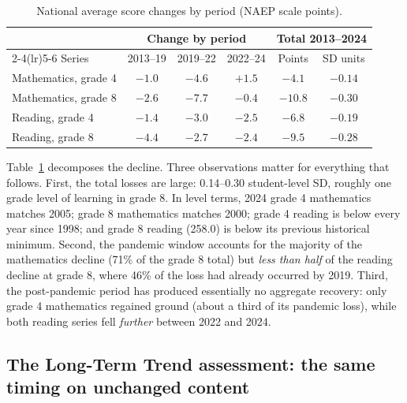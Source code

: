 \documentclass[11pt]{article}
\begin{document}
\begin{table}[tbp]
\centering\small
\caption{National average score changes by period (NAEP scale points).}
\label{tab:changes}
\begin{tabular}{lccccc}
\toprule
 & \multicolumn{3}{c}{Change by period} & \multicolumn{2}{c}{Total 2013--2024} \\
\cmidrule(lr){2-4}\cmidrule(lr){5-6}
Series & 2013--19 & 2019--22 & 2022--24 & Points & SD units \\
\midrule
Mathematics, grade 4 & $-1.0$ & $-4.6$ & $+1.5$ & $-4.1$ & $-0.14$ \\
Mathematics, grade 8 & $-2.6$ & $-7.7$ & $-0.4$ & $-10.8$ & $-0.30$ \\
Reading, grade 4     & $-1.4$ & $-3.0$ & $-2.5$ & $-6.8$ & $-0.19$ \\
Reading, grade 8     & $-4.4$ & $-2.7$ & $-2.4$ & $-9.5$ & $-0.28$ \\
\bottomrule
\end{tabular}
\end{table}

Table~\ref{tab:changes} decomposes the decline. Three observations matter for everything that follows. First, the total losses are large: 0.14--0.30 student-level SD, roughly one grade level of learning in grade 8. In level terms, 2024 grade 4 mathematics matches 2005; grade 8 mathematics matches 2000; grade 4 reading is below every year since 1998; and grade 8 reading (258.0) is below its previous historical minimum. Second, the pandemic window accounts for the majority of the mathematics decline (71\% of the grade 8 total) but \emph{less than half} of the reading decline at grade 8, where 46\% of the loss had already occurred by 2019. Third, the post-pandemic period has produced essentially no aggregate recovery: only grade 4 mathematics regained ground (about a third of its pandemic loss), while both reading series fell \emph{further} between 2022 and 2024.

\subsection{The Long-Term Trend assessment: the same timing on unchanged content}
\label{sec:ltt}
\end{document}
